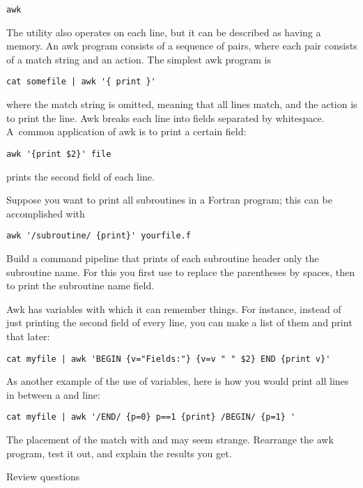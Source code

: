  {\tt awk}

The  utility also operates on each line, but it can be
described as having a memory. An awk program consists of a sequence of
pairs, where each pair consists of a match string and an action. The
simplest awk program is
\begin{verbatim}
cat somefile | awk '{ print }'
\end{verbatim}
where the match string is omitted, meaning that all lines match, and
the action is to print the line. Awk breaks each line into fields
separated by whitespace. A~common application of awk is to print a
certain field:
\begin{verbatim}
awk '{print $2}' file
\end{verbatim}
prints the second field of each line.

Suppose you want to print all subroutines in a Fortran program; this
can be accomplished with
\begin{verbatim}
awk '/subroutine/ {print}' yourfile.f
\end{verbatim}

\begin{exercise}
  Build a command pipeline that prints of each subroutine header only
  the subroutine name. For this you first use  to replace the
  parentheses by spaces, then  to print the subroutine name
  field.
\end{exercise}

Awk has variables with which it can remember things. For instance,
instead of just printing the second field of every line, you can make
a list of them and print that later:
\begin{verbatim}
cat myfile | awk 'BEGIN {v="Fields:"} {v=v " " $2} END {print v}'
\end{verbatim}

As another example of the use of variables, here is how you would
print all lines in between a  and  line:
\begin{verbatim}
cat myfile | awk '/END/ {p=0} p==1 {print} /BEGIN/ {p=1} '
\end{verbatim}

\begin{exercise}
  The placement of the match with  and  may seem
  strange. Rearrange the awk program, test it out, and explain the
  results you get.
\end{exercise}

 {Review questions}

